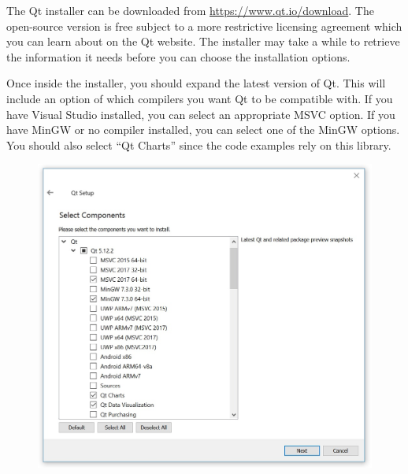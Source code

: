 \documentclass[12pt]{article}
\begin{document}
\makeatletter
\renewcommand{\@maketitle}{
\newpage
\null
\vskip 2em
\begin{center}
{\LARGE \@title \par}
\end{center}
\par
} \makeatother

\maketitle

The Qt installer can be downloaded from \href{https://www.qt.io/download}{https://www.qt.io/download}. The open-source version is free subject to a more restrictive licensing agreement which you can learn about on the Qt website. The installer may take a while to retrieve the information it needs before you can choose the installation options.

Once inside the installer, you should expand the latest version of Qt. This will include an option of which compilers you want Qt to be compatible with. If you have Visual Studio installed, you can select an appropriate MSVC option. If you have MinGW or no compiler installed, you can select one of the MinGW options. You should also select ``Qt Charts'' since the code examples rely on this library.

\begin{figure}[h]
	\centering
		\includegraphics[width=1.00\textwidth]{fig/installer.jpg}
\end{figure}
\clearpage
\end{document}
